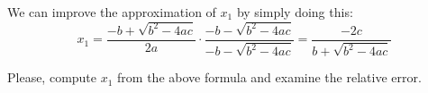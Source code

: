 \documentclass[main.tex]{subfiles}
\begin{document}
\par We can improve the approximation of $x_1$ by simply doing this: 
\begin{equation}
x_1 = \dfrac{-b + \sqrt{b^2 - 4ac}}{2a} \cdot \dfrac{-b - \sqrt{b^2 - 4ac}}{-b - \sqrt{b^2 - 4ac}} = \dfrac{-2c}{b + \sqrt{b^2 - 4ac}} 
\end{equation}
\par Please, compute $x_1$ from the above formula and examine the relative error.  
\end{document}
